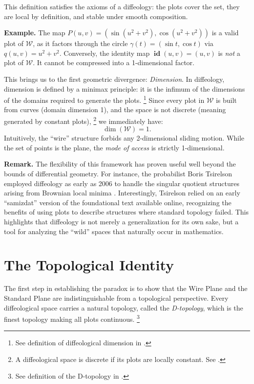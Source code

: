 \documentclass[10pt,letterpaper,reqno]{amsart}
\newcommand{\cW}{\mathcal{W}}
\DeclareMathOperator{\id}{\mathbf{id}}
\begin{document}
  This definition satisfies the axioms of a diffeology:
  the plots cover the set,
  they are local by definition,
  and stable under smooth composition.
  
  \textbf{Example.}
  The map $P(u,v) = (\sin(u^2+v^2), \cos(u^2+v^2))$ is a valid plot of $\cW$,
  as it factors through the circle $\gamma(t) = (\sin t, \cos t)$ via $q(u,v) = u^2+v^2$.
  Conversely,
  the identity map $\id(u,v) = (u,v)$ is \emph{not} a plot of $\cW$.
  It cannot be compressed into a 1-dimensional factor.
  
  This brings us to the first geometric divergence: \emph{Dimension}.
  In diffeology,
  dimension is defined by a minimax principle:
  it is the infimum of the dimensions of the domains required to generate the plots.%
  \footnote{See definition of diffeological dimension in \cite[]{PIZ13}.}
  Since every plot in $\cW$ is built from curves (domain dimension 1),
  and the space is not discrete (meaning generated by constant plots),%
  \footnote{A diffeological space is discrete if its plots are locally constant. See \cite[]{PIZ13}.}
  we immediately have:
  $$
    \dim(\cW) = 1.
    $$
  Intuitively,
  the ``wire'' structure forbids any 2-dimensional sliding motion.
  While the set of points is the plane,
  the \emph{mode of access} is strictly 1-dimensional.
  
  \textbf{Remark.}
  The flexibility of this framework has proven useful well beyond the bounds of differential geometry.
  For instance,
  the probabilist Boris Tsirelson employed diffeology as early as 2006 to handle the singular quotient structures arising from Brownian local minima \cite{Tsi06}.
  Interestingly,
  Tsirelson relied on an early ``samizdat'' version of the foundational text \cite{PIZ13} available online,
  recognizing the benefits of using plots to describe structures where standard topology failed.
  This highlights that diffeology is not merely a generalization for its own sake,
  but a tool for analyzing the ``wild'' spaces that naturally occur in mathematics.
  
  
  \section{The Topological Identity}
  
  The first step in establishing the paradox is to show that the Wire Plane and the Standard Plane are indistinguishable from a topological perspective.
  Every diffeological space carries a natural topology,
  called the \emph{D-topology},
  which is the finest topology making all plots continuous.%
  \footnote{See definition of the D-topology in \cite[]{PIZ13}.}
  
\end{document}
